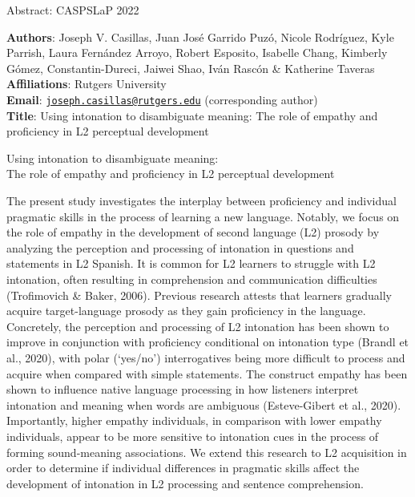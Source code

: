 \documentclass[
  12pt,
]{article}
\author{}
\date{\vspace{-2.5em}}
\begin{document}
\begin{center}
Abstract: CASPSLaP 2022
\end{center}

\textbf{Authors}: Joseph V. Casillas, Juan José Garrido Puzó, Nicole
Rodríguez, Kyle Parrish, Laura Fernández Arroyo, Robert Esposito,
Isabelle Chang, Kimberly Gómez, Constantin-Dureci, Jaiwei Shao, Iván
Rascón \& Katherine Taveras\\
\textbf{Affiliations}: Rutgers University\\
\textbf{Email}:
\href{mailto:joseph.casillas@rutgers.edu}{\nolinkurl{joseph.casillas@rutgers.edu}}
(corresponding author)\\
\textbf{Title}: Using intonation to disambiguate meaning: The role of
empathy and proficiency in L2 perceptual development

\clearpage

\begin{center}
{\large Using intonation to disambiguate meaning: \\
The role of empathy and proficiency in L2 perceptual development}
\end{center}

The present study investigates the interplay between proficiency and
individual pragmatic skills in the process of learning a new language.
Notably, we focus on the role of empathy in the development of second
language (L2) prosody by analyzing the perception and processing of
intonation in questions and statements in L2 Spanish. It is common for
L2 learners to struggle with L2 intonation, often resulting in
comprehension and communication difficulties (Trofimovich \& Baker,
2006). Previous research attests that learners gradually acquire
target-language prosody as they gain proficiency in the language.
Concretely, the perception and processing of L2 intonation has been
shown to improve in conjunction with proficiency conditional on
intonation type (Brandl et al., 2020), with polar (`yes/no')
interrogatives being more difficult to process and acquire when compared
with simple statements. The construct empathy has been shown to
influence native language processing in how listeners interpret
intonation and meaning when words are ambiguous (Esteve-Gibert et al.,
2020). Importantly, higher empathy individuals, in comparison with lower
empathy individuals, appear to be more sensitive to intonation cues in
the process of forming sound-meaning associations. We extend this
research to L2 acquisition in order to determine if individual
differences in pragmatic skills affect the development of intonation in
L2 processing and sentence comprehension.
\end{document}
